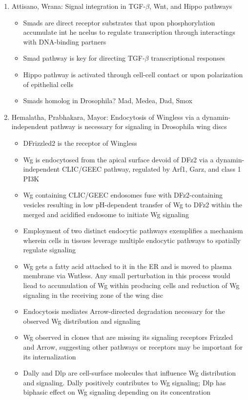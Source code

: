 \documentclass[12pt]{article}
\begin{document}
\begin{enumerate}
\item Attisano, Wrana: Signal integration in TGF-$\beta$, Wnt, and Hippo pathways
\begin{itemize}
	\item Smads are direct receptor substrates that upon phosphorylation accumulate int he ncelus to regulate transcription through interactings with DNA-binding partners
	\item Smad pathway is key for directing TGF-$\beta$ transcriptional responses
	\item Hippo pathway is activated through cell-cell contact or upon polarization of epithelial cells
	\item Smads homolog in Drosophila? Mad, Medea, Dad, Smox 
\end{itemize}

\item Hemalatha, Prabhakara, Mayor: Endocytosis of Wingless via a dynamin-independent pathway is necessary for signaling in Drosophila wing discs
\begin{itemize}
	\item DFrizzled2 is the receptor of Wingless
	\item Wg is endocytosed from the apical surface devoid of DFz2 via a dynamin-independent CLIC/GEEC pathway, regulated by Arf1, Garz, and class 1 PI3K
	\item Wg containing CLIC/GEEC endosomes fuse with DFz2-containing vesicles resulting in low pH-dependent transfer of Wg to DFz2 within the merged and acidified endosome to initiate Wg signaling
	\item Employment of two distinct endocytic pathways exemplifies a mechanism wherein cells in tissues leverage multiple endocytic pathways to spatially regulate signaling
	\item Wg gets a fatty acid attached to it in the ER and is moved to plasma membrane via Wntless. Any small perturbation in this process would liead to accumulation of Wg within producing cells and reduction of Wg signaling in the receiving zone of the wing disc 
	\item Endocytosis mediates Arrow-directed degradation necessary for the observed Wg distribution and signaling
	\item Wg observed in clones that are missing its signaling receptors Frizzled and Arrow, suggesting other pathways or receptors may be important for its internalization
	\item Dally and Dlp are cell-surface molecules that influence Wg distribution and signaling. Dally positively contributes to Wg signaling; Dlp has biphasic effect on Wg signaling depending on its concentration

\end{itemize}
\end{enumerate}
\end{document}
